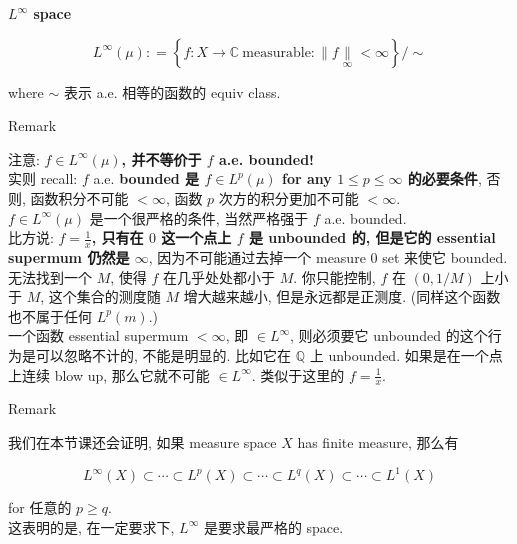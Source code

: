 \documentclass{qlnotes-export}
\begin{document}
\begin{definition}{\protect{}\label{kn-l-infty-space}{\textbf{\(L^{\infty}\)
space}}}

\[L^{\infty}(\mu): = \left\{ {f:X\rightarrow{\mathbb{C}}\ \text{measurable}: \parallel f\underset{\infty}{\parallel} < \infty} \right\}/ \sim\]

where \(\sim\) 表示 a.e. 相等的函数的 equiv class.

\end{definition}

\begin{qlremark}{Remark}

注意: \textbf{\(f \in L^{\infty}(\mu)\), 并不等价于 \(f\) a.e. bounded!}\\
实则 recall: \(f\) a.e. \textbf{bounded 是 \(f \in L^{p}(\mu)\) for any \(1 \leq p \leq \infty\) 的必要条件}, 否则, 函数积分不可能 \(< \infty\), 函数 \(p\) 次方的积分更加不可能 \(< \infty\).\\
\(f \in L^{\infty}(\mu)\) 是一个很严格的条件, 当然严格强于 \(f\) a.e. bounded.\\
比方说: \textbf{\(f = \frac{1}{x}\), 只有在 \(0\) 这一个点上 \(f\) 是 unbounded 的, 但是它的 essential supermum 仍然是 \(\infty\)}, 因为不可能通过去掉一个 measure \(0\) set 来使它 bounded.\\
无法找到一个 \(M\), 使得 \(f\) 在几乎处处都小于 \(M\). 你只能控制, \(f\) 在 \((0,1/M)\) 上小于 \(M\), 这个集合的测度随 \(M\) 增大越来越小, 但是永远都是正测度. (同样这个函数也不属于任何 \(L^{p}(m)\).)\\
一个函数 essential supermum \(< \infty\), 即 \(\in L^{\infty}\), 则必须要它 unbounded 的这个行为是可以忽略不计的, 不能是明显的. 比如它在 \(\mathbb{Q}\) 上 unbounded. 如果是在一个点上连续 blow up, 那么它就不可能 \(\in L^{\infty}\). 类似于这里的 \(f = \frac{1}{x}\).\\

\end{qlremark}

\begin{qlremark}{Remark}

我们在本节课还会证明, 如果 measure space \(X\) has finite measure, 那么有

\[L^{\infty}(X) \subset \cdots \subset L^{p}(X) \subset \cdots \subset L^{q}(X) \subset \cdots \subset L^{1}(X)\]

for 任意的 \(p \geq q\).\\
这表明的是, 在一定要求下, \(L^{\infty}\) 是要求最严格的 space.

\end{qlremark}
\end{document}
